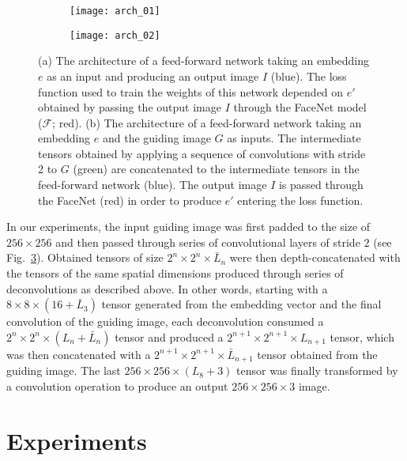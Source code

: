 \documentclass{article}
\def\F{\mc{F}}
\def\Emb{e}
\newcommand{\mc}[1]{\mathcal{#1}}
\newcommand{\Fig}[1]{Fig.~\ref{#1}}
\begin{document}
  \begin{figure}
  \centering
  \captionsetup[subfigure]{labelformat=parens}
    \begin{subfigure}{.49\textwidth}
      \texttt{[image: arch\_01]}
      \centering
      \caption{}
      \label{fig:arch1}
    \end{subfigure}
    \begin{subfigure}{.49\textwidth}
      \texttt{[image: arch\_02]}
      \centering
      \caption{}
      \label{fig:arch2}
    \end{subfigure}
    \caption{
      (a) The architecture of a feed-forward network taking an embedding $\Emb$ as an input and producing an output image $I$ (blue).
          The loss function used to train the weights of this network depended on $\Emb'$ obtained by passing the output image $I$ through the FaceNet model ($\F$; red).
      (b) The architecture of a feed-forward network taking an embedding $\Emb$ and the guiding image $G$ as inputs.
          The intermediate tensors obtained by applying a sequence of convolutions with stride 2 to $G$ (green) are concatenated to the intermediate tensors in the feed-forward network (blue).
          The output image $I$ is passed through the FaceNet (red) in order to produce $\Emb'$ entering the loss function.
    }
  \end{figure}

  In our experiments, the input guiding image was first padded to the size of $256\times 256$ and then passed through series of convolutional layers of stride $2$ (see \Fig{fig:arch2}).
  Obtained tensors of size $2^n \times 2^n \times \bar{L}_n$ were then depth-concatenated with the tensors of the same spatial dimensions produced through series of deconvolutions as described above.
  In other words, starting with a $8\times 8\times (16 + \bar{L}_3)$ tensor generated from the embedding vector and the final convolution of the guiding image, each deconvolution consumed a $2^n \times 2^n \times (L_n + \bar{L}_n)$ tensor and produced a $2^{n+1} \times 2^{n+1} \times L_{n+1}$ tensor, which was then concatenated with a $2^{n+1} \times 2^{n+1} \times \bar{L}_{n+1}$ tensor obtained from the guiding image.
  The last $256\times 256 \times (L_8 + 3)$ tensor was finally transformed by a convolution operation to produce an output $256\times 256\times 3$ image.

\section{Experiments}
\label{sec:experiments}
\end{document}
